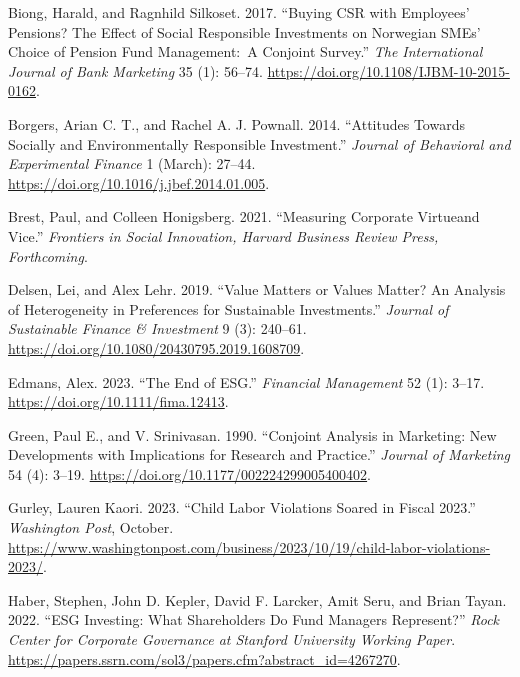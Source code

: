 \documentclass[
  12pt,
]{article}
\newlength{\cslhangindent}
\newlength{\cslentryspacingunit} %
\newenvironment{CSLReferences}[2] %
 {%
  \setlength{\parindent}{0pt}
  \ifodd #1
  \let\oldpar\par
  \def\par{\hangindent=\cslhangindent\oldpar}
  \fi
  \setlength{\parskip}{#2\cslentryspacingunit}
 }%
 {}
\begin{document}
\begin{CSLReferences}{1}{0}
\leavevmode{}%
Biong, Harald, and Ragnhild Silkoset. 2017. {``Buying CSR with Employees' Pensions? The Effect of Social Responsible Investments on Norwegian SMEs' Choice of Pension Fund Management:~A Conjoint Survey.''} \emph{The International Journal of Bank Marketing} 35 (1): 56--74. \url{https://doi.org/10.1108/IJBM-10-2015-0162}.

\leavevmode{}%
Borgers, Arian C. T., and Rachel A. J. Pownall. 2014. {``Attitudes Towards Socially and Environmentally Responsible Investment.''} \emph{Journal of Behavioral and Experimental Finance} 1 (March): 27--44. \url{https://doi.org/10.1016/j.jbef.2014.01.005}.

\leavevmode{}%
Brest, Paul, and Colleen Honigsberg. 2021. {``Measuring Corporate Virtue{\textemdash}and Vice.''} \emph{Frontiers in Social Innovation, Harvard Business Review Press, Forthcoming}.

\leavevmode{}%
Delsen, Lei, and Alex Lehr. 2019. {``Value Matters or Values Matter? An Analysis of Heterogeneity in Preferences for Sustainable Investments.''} \emph{Journal of Sustainable Finance \& Investment} 9 (3): 240--61. \url{https://doi.org/10.1080/20430795.2019.1608709}.

\leavevmode{}%
Edmans, Alex. 2023. {``The End of ESG.''} \emph{Financial Management} 52 (1): 3--17. \url{https://doi.org/10.1111/fima.12413}.

\leavevmode{}%
Green, Paul E., and V. Srinivasan. 1990. {``Conjoint Analysis in Marketing: New Developments with Implications for Research and Practice.''} \emph{Journal of Marketing} 54 (4): 3--19. \url{https://doi.org/10.1177/002224299005400402}.

\leavevmode{}%
Gurley, Lauren Kaori. 2023. {``Child Labor Violations Soared in Fiscal 2023.''} \emph{Washington Post}, October. \url{https://www.washingtonpost.com/business/2023/10/19/child-labor-violations-2023/}.

\leavevmode{}%
Haber, Stephen, John D. Kepler, David F. Larcker, Amit Seru, and Brian Tayan. 2022. {``ESG Investing: What Shareholders Do Fund Managers Represent?''} \emph{Rock Center for Corporate Governance at Stanford University Working Paper}. \url{https://papers.ssrn.com/sol3/papers.cfm?abstract_id=4267270}.


\end{CSLReferences}
\end{document}

